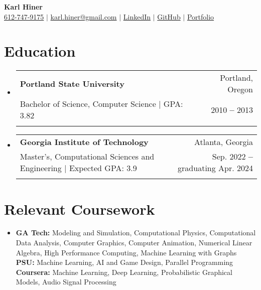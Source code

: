 \documentclass[letterpaper,11pt]{article}
\makeatletter
\newcommand{\resumeItem}[1]{
  \item\small{
    {#1 \vspace{-2pt}}
  }
}
\newcommand{\resumeEducationHeading}[6]{
  \vspace{-2pt}\item
    \begin{tabular*}{0.97\textwidth}[t]{l@{\extracolsep{\fill}}r}
      \textbf{#1} & \small #2 \\
      \small#3 & \small #4 \\
      \small#5 & \small #6 \\
    \end{tabular*}\vspace{-1.75em}
}
\newcommand{\resumeSubHeadingListStart}{\begin{itemize}[leftmargin=0.15in, label={}]}
\newcommand{\resumeSubHeadingListEnd}{\end{itemize}}
\makeatother
\begin{document}

\hypersetup{urlcolor = black} %

\begin{center}
    \textbf{\Huge Karl Hiner} \\ \vspace{3pt}
    \small
    \faMobile \hspace{.5pt} \href{tel:6127479175}{612-747-9175}
    $|$
    \faAt \hspace{.5pt} \href{mailto:karl.hiner@gmail.com}{karl.hiner@gmail.com}
    $|$
    \faLinkedinSquare \hspace{.5pt} \href{https://www.linkedin.com/in/karl-hiner-9534b333}{LinkedIn}
    $|$
    \faGithub \hspace{.5pt} \href{https://github.com/khiner}{GitHub}
    $|$
    \faGlobe \hspace{.5pt} \href{https://karlhiner.com}{Portfolio}
\end{center}
\vspace{-18pt}

\hypersetup{urlcolor = linkcolor} %

\section{Education}
  \vspace{1pt}
  \resumeSubHeadingListStart
    \resumeEducationHeading
      {Portland State University}{Portland, Oregon}
      {Bachelor of Science, Computer Science $|$ \footnotesize{GPA: 3.82}}{2010 \textbf{--} 2013}{}{}
    \resumeEducationHeading
      {Georgia Institute of Technology}{Atlanta, Georgia}
      {Master's, Computational Sciences and Engineering $|$ \footnotesize{Expected GPA: 3.9}}{Sep. 2022 \textbf{--} graduating Apr. 2024}{}{}
  \resumeSubHeadingListEnd

\section{Relevant Coursework}
  \resumeSubHeadingListStart
    \resumeItem{
      \textbf{GA Tech:}{ Modeling and Simulation, Computational Physics, Computational Data Analysis, Computer Graphics, Computer Animation, Numerical Linear Algebra, High Performance Computing, Machine Learning with Graphs} \\ \vspace{3pt}
      \textbf{PSU:}{ Machine Learning, AI and Game Design, Parallel Programming} \\ \vspace{3pt}
      \textbf{Coursera:}{ Machine Learning, Deep Learning, Probabilistic Graphical Models, Audio Signal Processing} \\ \vspace{3pt}
    }
    \resumeSubHeadingListEnd
\end{document}
